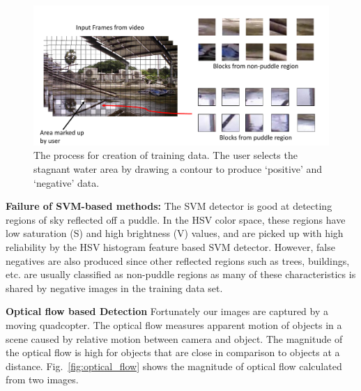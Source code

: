 \documentclass[11pt]{article}
\begin{document}
\begin{figure}[h!]
  \centering
  \includegraphics[width=0.9\linewidth]{stagnantWater/figures/trainingData.pdf}
  \caption{The process for creation of training data. The user selects
    the stagnant water area by drawing a contour to produce `positive'
    and `negative'  data.}
  \label{fig:training}
\end{figure}

\textbf{Failure of SVM-based methods:} The SVM detector is good at
detecting regions of sky reflected off a puddle.  In the HSV color
space, these regions have low saturation (S) and high brightness (V)
values, and are picked up with high reliability by the HSV histogram
feature based SVM detector. However, false negatives are also produced
since other reflected regions such as trees, buildings, etc. are
usually classified as non-puddle regions as many of these
characteristics is shared by negative images in the training data set.
\vspace{0.5cm}

\noindent\textbf{Optical flow based Detection}
Fortunately our images are captured by a moving quadcopter.  The
optical flow measures apparent motion of objects in a scene caused by
relative motion between camera and object. The magnitude of the
optical flow is high for objects that are close in comparison to
objects at a distance.  Fig.~\ref{fig:optical_flow} shows the
magnitude of optical flow calculated from two images.
\end{document}
